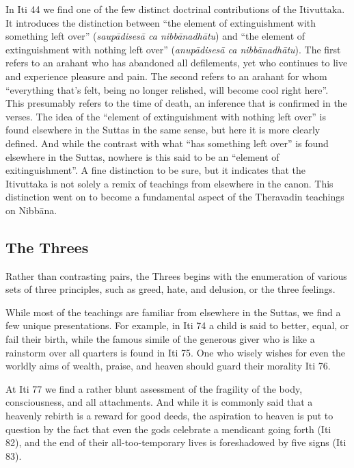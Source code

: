 \documentclass[12pt,openany]{book}%
\begin{document}
In Iti 44 we find one of the few distinct doctrinal contributions of the Itivuttaka. It introduces the distinction between “the element of extinguishment with something left over” (\emph{\textsanskrit{saupādisesā} ca \textsanskrit{nibbānadhātu}}) and “the element of extinguishment with nothing left over” (\emph{\textsanskrit{anupādisesā} ca \textsanskrit{nibbānadhātu}}). The first refers to an arahant who has abandoned all defilements, yet who continues to live and experience pleasure and pain. The second refers to an arahant for whom “everything that’s felt, being no longer relished, will become cool right here”. This presumably refers to the time of death, an inference that is confirmed in the verses. The idea of the “element of extinguishment with nothing left over” is found elsewhere in the Suttas in the same sense, but here it is more clearly defined. And while the contrast with what “has something left over” is found elsewhere in the Suttas, nowhere is this said to be an “element of exitinguishment”. A fine distinction to be sure, but it indicates that the Itivuttaka is not solely a remix of teachings from elsewhere in the canon. This distinction went on to become a fundamental aspect of the Theravadin teachings on \textsanskrit{Nibbāna}.

\subsection*{The Threes}

Rather than contrasting pairs, the Threes begins with the enumeration of various sets of three principles, such as greed, hate, and delusion, or the three feelings.

While most of the teachings are familiar from elsewhere in the Suttas, we find a few unique presentations. For example, in Iti 74 a child is said to better, equal, or fail their birth, while the famous simile of the generous giver who is like a rainstorm over all quarters is found in Iti 75. One who wisely wishes for even the worldly aims of wealth, praise, and heaven should guard their morality Iti 76.

At Iti 77 we find a rather blunt assessment of the fragility of the body, consciousness, and all attachments. And while it is commonly said that a heavenly rebirth is a reward for good deeds, the aspiration to heaven is put to question by the fact that even the gods celebrate a mendicant going forth (Iti 82), and the end of their all-too-temporary lives is foreshadowed by five signs (Iti 83).
\end{document}
